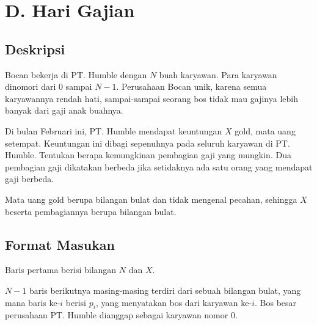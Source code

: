 \documentclass{article}
\begin{document}
\pagestyle{fancy}
\fancyhf{}
\renewcommand{\headrulewidth}{0pt}

\section*{\hfil D. Hari Gajian\hfil}


\subsection*{Deskripsi}

\par\noindent Bocan bekerja di PT. Humble dengan $N$ buah karyawan. Para karyawan dinomori dari $0$ sampai $N-1$. Perusahaan Bocan unik, karena semua karyawannya rendah hati, sampai-sampai seorang bos tidak mau gajinya lebih banyak dari gaji anak buahnya.
\newline
\par\noindent Di bulan Februari ini, PT. Humble mendapat keuntungan $X$ gold, mata uang setempat. Keuntungan ini dibagi sepenuhnya pada seluruh karyawan di PT. Humble. Tentukan berapa kemungkinan pembagian gaji yang mungkin. Dua pembagian gaji dikatakan berbeda jika setidaknya ada satu orang yang mendapat gaji berbeda.
\newline
\par\noindent Mata uang gold berupa bilangan bulat dan tidak mengenal pecahan, sehingga $X$ beserta pembagiannya berupa bilangan bulat.

\subsection*{Format Masukan}

\par\noindent Baris pertama berisi bilangan $N$ dan $X$.
\par\noindent $N-1$ baris berikutnya masing-masing terdiri dari sebuah bilangan bulat, yang mana baris ke-$i$ berisi $p_{i}$, yang menyatakan bos dari karyawan ke-$i$. Bos besar perusahaan PT. Humble dianggap sebagai karyawan nomor $0$.
\end{document}

